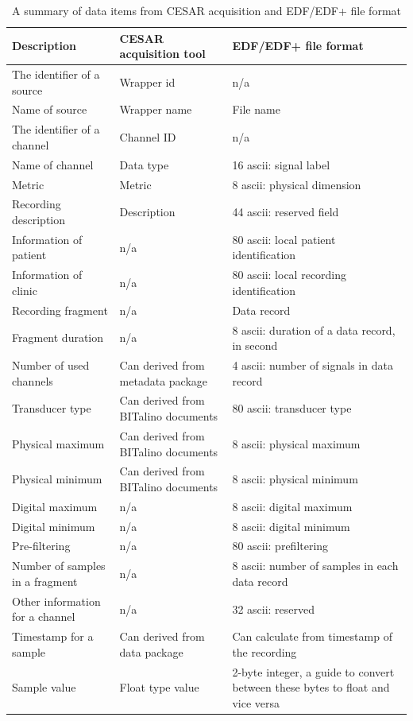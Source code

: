 \begin{table}[ht]
\begin{center}
\begin{tabular}{ |p{3.3cm}||p{5cm}|p{5cm}|  }
 \hline
 Description& CESAR acquisition tool & EDF/EDF+ file format \\
 \hline
 The identifier of a source& Wrapper id& n/a\\
 \hline
 Name of source& Wrapper name& File name\\
 \hline
 The identifier of a channel& Channel ID& n/a\\
 \hline
 Name of channel& Data type& 16 ascii: signal label\\
 \hline
 Metric& Metric& 8 ascii: physical dimension\\
 \hline
 Recording description& Description& 44 ascii: reserved field\\
 \hline
 Information of patient& n/a& 80 ascii: local patient identification\\
 \hline
 Information of clinic& n/a& 80 ascii: local recording identification\\
 \hline
 Recording fragment& n/a& Data record\\
 \hline
 Fragment duration& n/a& 8 ascii: duration of a data record, in second\\
 \hline
 Number of used channels& Can derived from metadata package& 4 ascii: number of signals in data record\\
 \hline
 Transducer type& Can derived from BITalino documents& 80 ascii: transducer type\\
 \hline
 Physical maximum& Can derived from BITalino documents& 8 ascii: physical maximum\\
 \hline
 Physical minimum& Can derived from BITalino documents& 8 ascii: physical minimum\\
 \hline
 Digital maximum& n/a& 8 ascii: digital maximum\\
 \hline
 Digital minimum& n/a& 8 ascii: digital minimum\\
 \hline
 Pre-filtering& n/a& 80 ascii: prefiltering\\
 \hline
 Number of samples in a fragment& n/a& 8 ascii: number of samples in each data record\\
 \hline
 Other information for a channel& n/a& 32 ascii: reserved\\
 \hline
 Timestamp for a sample& Can derived from data package& Can calculate from timestamp of the recording\\
 \hline
 Sample value& Float type value& 2-byte integer, a guide to convert between these bytes to float and vice versa\\
 \hline
\end{tabular}
\end{center}
\caption{A summary of data items from CESAR acquisition and EDF/EDF+ file format}
\label{tab:Datasources}
\end{table}
